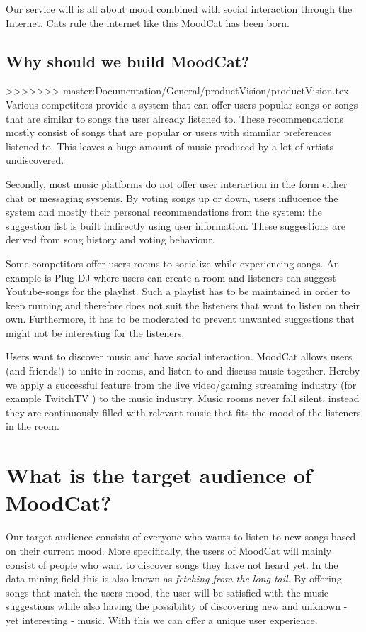 \documentclass[10pt,a4paper]{article}
\begin{document}
Our service will is all about mood combined with social interaction through the Internet. Cats rule the internet like this MoodCat has been born.

\section{Why should we build MoodCat?}
>>>>>>> master:Documentation/General/productVision/productVision.tex
Various competitors provide a system that can offer users popular songs or songs that are similar to songs the user already listened to.
These recommendations mostly consist of songs that are popular or users with simmilar preferences listened to.
This leaves a huge amount of music produced by a lot of artists undiscovered.

Secondly, most music platforms do not offer user interaction in the form either chat or messaging systems.
By voting songs up or down, users influcence the system and mostly their personal recommendations from the system: the suggestion list is built indirectly using user information.
These suggestions are derived from song history and voting behaviour.

Some competitors offer users rooms to socialize while experiencing songs.
An example is Plug DJ \cite{PlugDJ} where users can create a room and listeners can suggest Youtube-songs\cite{Youtube} for the playlist.
Such a playlist has to be maintained in order to keep running and therefore does not suit the listeners that want to listen on their own.
Furthermore, it has to be moderated to prevent unwanted suggestions that might not be interesting for the listeners.

\bigskip 

Users want to discover music and have social interaction.
MoodCat allows users (and friends!) to unite in rooms, and listen to and discuss music together.
Hereby we apply a successful feature from the live video/gaming streaming industry (for example TwitchTV \cite{Twitch}) to the music industry.
Music rooms never fall silent, instead they are continuously filled with relevant music that fits the mood of the listeners in the room.

\chapter{What is the target audience of MoodCat?}
Our target audience consists of everyone who wants to listen to new songs based on their current mood.
More specifically, the users of MoodCat will mainly consist of people who want to discover songs they have not heard yet.
In the data-mining field this is also known as \textit{fetching from the long tail}\cite{longtail}.
By offering songs that match the users mood, the user will be satisfied with the music suggestions while also having the possibility of discovering new and unknown - yet interesting - music.
With this we can offer a unique user experience.
\end{document}
